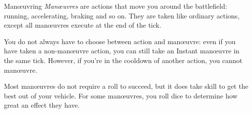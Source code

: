 
\begin{abstractsection}{Man\oe{}uvring}
\emph{Man\oe{}uvres} are actions that move you around the battlefield: running, accelerating, braking and so on. They are taken like ordinary actions, except all man\oe{}uvres execute at the end of the tick.

You do not always have to choose between action and man\oe{}uvre: even if you have taken a non-man\oe{}uvre action, you can still take an Instant man\oe{}uvre in the same tick. However, if you're in the cooldown of another action, you cannot man\oe{}uvre.

Most man\oe{}uvres do not require a roll to succeed, but it does take skill to get the best out of your vehicle. For some man\oe{}uvres, you roll dice to determine how great an effect they have.
\end{abstractsection}
